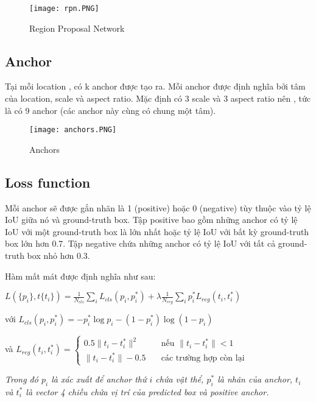 \documentclass[../thesis.tex]{subfiles}
\begin{document}
\begin{figure}[!htb]
	\centering
	\texttt{[image: rpn.PNG]}
	\caption{Region Proposal Network}\label{Fig:rpn}
\end{figure}

\subsection{Anchor}

Tại mỗi location , có k anchor được tạo ra. Mỗi anchor được định nghĩa bởi tâm của location, scale và aspect ratio. Mặc định có 3 scale và 3 aspect ratio nên , tức là có 9 anchor (các anchor này cùng có chung một tâm).

\begin{figure}[!htb]
	\centering
	\texttt{[image: anchors.PNG]}
	\caption{Anchors}\label{Fig:anchors}
\end{figure}

\subsection{Loss function}

Mỗi anchor sẽ được gắn nhãn là 1 (positive) hoặc 0 (negative) tùy thuộc vào tỷ lệ IoU giữa nó và ground-truth box. Tập positive bao gồm những anchor có tỷ lệ IoU với một ground-truth box là lớn nhất hoặc tỷ lệ IoU với bất kỳ ground-truth box lớn hơn 0.7. Tập negative chứa những anchor có tỷ lệ IoU với tất cả ground-truth box nhỏ hơn 0.3.

Hàm mất mát được định nghĩa như sau: 

$L(\{p_i\}, t\{t_i\}) = \displaystyle\frac{1}{N_{cls}}\displaystyle\sum_{i}^{} L_{cls}(p_i, p_i^*)+\lambda\displaystyle\frac{1}{N_{reg}}\displaystyle\sum_{i}^{}p_i^*L_{reg}(t_i,t_i^*)$

với $L_{cls}(p_i, p_i^*) = -p_i^*\log{p_i} - (1 - p_i^*)\log{(1-p_i)}$

và $L_{reg}(t_i,t_i^*) = 
\begin{cases}
    0.5\|t_i - t_i^*\|^2	& \quad \text{nếu }\|t_i - t_i^*\| < 1\\
    \|t_i - t_i^*\| - 0.5  	& \quad \text{các trường hợp còn lại}
\end{cases}
$

\textit{Trong đó $p_i$ là xác xuất để anchor thứ $i$ chứa vật thể, $p^*_i$ là nhãn của anchor, $t_i$ và $t^*_i$ là vector 4 chiều chứa vị trí của predicted box và positive anchor.}
\end{document}
